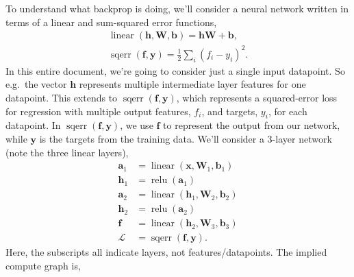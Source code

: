 \documentclass{article}
\newcommand{\bracket}[3]{\left#1 #3 \right#2}
\renewcommand{\b}{\bracket{(}{)}}
\newcommand{\x}{\mathbf{x}}
\newcommand{\y}{\mathbf{y}}
\newcommand{\f}{\mathbf{f}}
\newcommand{\h}{\mathbf{h}}
\newcommand{\bv}{\mathbf{b}}
\renewcommand{\a}{\mathbf{a}}
\newcommand{\W}{\mathbf{W}}
\renewcommand{\L}{\mathcal{L}}
\newcommand{\linear}{\operatorname{linear}}
\newcommand{\relu}{\operatorname{relu}}
\newcommand{\sqerr}{\operatorname{sqerr}}
\begin{document}
To understand what backprop is doing, we'll consider a neural network written in terms of a linear and sum-squared error functions,
\begin{subequations}
\begin{align}
  \label{eq:linear}
  \linear\b{\h, \W, \bv} = \h \W + \bv,\\
  \label{eq:sqerr}
  \sqerr\b{\f, \y} = \tfrac{1}{2} \sum_i (f_i - y_i)^2.
\end{align}
\end{subequations}
In this entire document, we're going to consider just a single input datapoint. 
So e.g.\ the vector $\h$ represents multiple intermediate layer features for one datapoint.
This extends to $\sqerr\b{\f, \y}$, which represents a squared-error loss for regression with multiple output features, $f_i$, and targets, $y_i$, for each datapoint.
In $\sqerr\b{\f, \y}$, we use $\f$ to represent the output from our network, while $\y$ is the targets from the training data.
We'll consider a 3-layer network (note the three linear layers),
\begin{subequations}
\label{eq:forward}
\begin{align}
  \a_1 &= \linear\b{\x, \W_1, \bv_1}\\
  \h_1 &= \relu\b{\a_1}\\
  \a_2 &= \linear\b{\h_1, \W_2, \bv_2}\\
  \h_2 &= \relu\b{\a_2}\\
  \f &= \linear\b{\h_2, \W_3, \bv_3}\\
  \label{eq:L}
  \L &= \sqerr\b{\f, \y}.
\end{align}
\end{subequations}
Here, the subscripts all indicate layers, not features/datapoints.
The implied compute graph is,
\end{document}

